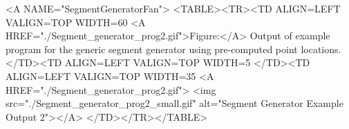 
\begin{ccHtmlOnly}
  <A NAME="SegmentGeneratorFan">
  <TABLE><TR><TD ALIGN=LEFT VALIGN=TOP WIDTH=60%
    <A HREF="./Segment_generator_prog2.gif">Figure:</A>
    Output of example program for the generic segment generator using
    pre-computed point locations.
  </TD><TD ALIGN=LEFT VALIGN=TOP WIDTH=5%
  </TD><TD ALIGN=LEFT VALIGN=TOP WIDTH=35%
    <A HREF="./Segment_generator_prog2.gif">
        <img src="./Segment_generator_prog2_small.gif" 
             alt="Segment Generator Example Output 2"></A>
  </TD></TR></TABLE>
\end{ccHtmlOnly}


\ccParDims
\cgalColumnLayout



\ccParDims
\beforecprogskip\parskip
{}


